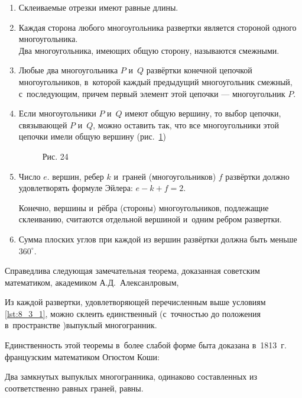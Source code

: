 \begin{enumerate}\label{lst:8_3_1}
\item Склеиваемые отрезки имеют равные длины.
\item Каждая сторона любого многоугольника развертки является стороной одного
многоугольника.\\
Два многоугольника, имеющих общую сторону, называются смежными.
\item Любые два многоугольника $P$ и~$Q$ развёртки конечной цепочкой
многоугольников, в~которой каждый предыдущий многоугольник смежный, с~последующим,
причем первый элемент этой цепочки --- многоугольник $P$.
\item Если многоугольники $P$ и~$Q$ имеют общую вершину, то выбор цепочки,
связывающей $P$ и~$Q$‚ можно оставить так, что все многоугольники этой цепочки
имели общую вершину (рис.\ \ref{fig:8_3_24})


\begin{figure}\label{fig:8_3_24}
\caption{Рис. 24}
\end{figure}

\item Число $e$. вершин, ребер $k$ и~граней (многоугольников) $f$ развёртки
должно удовлетворять формуле Эйлера: $e - k + f = 2$.

Конечно, вершины и~рёбра (стороны) многоугольников, подлежащие склеиванию,
считаются отдельной вершиной и~одним ребром развертки.

\item Сумма плоских углов при каждой из вершин развёртки должна быть меньше
$360^{\circ}$.

\end{enumerate}

Справедлива следующая замечательная теорема, доказанная советским математиком,
академиком А.Д.~Алексанлровым,

\begin{Th}
  Из каждой развертки, удовлетворяющей перечисленным выше условиям \ref{lst:8_3_1},
можно склеить единственный (с~точностью до положения в~пространстве )выпуклый
многогранник.
\end{Th}

Единственность этой теоремы в~более слабой форме быта доказана в~1813~г.
французским математиком Огюстом Коши:

\begin{Th}
Два замкнутых выпуклых многогранника, одинаково составленных из соответственно
равных граней, равны.
\end{Th}

